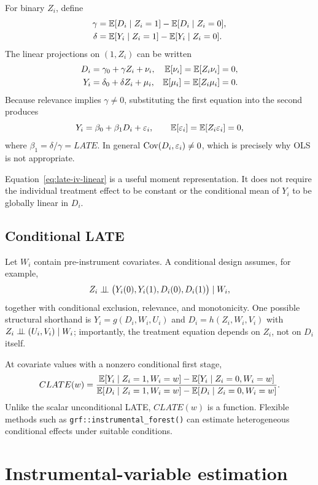 For binary $Z_i$, define
\begin{align*}
  \gamma&=\mathbb{E}[D_i\mid Z_i=1]-\mathbb{E}[D_i\mid Z_i=0],\\
  \delta&=\mathbb{E}[Y_i\mid Z_i=1]-\mathbb{E}[Y_i\mid Z_i=0].
\end{align*}
The linear projections on $(1,Z_i)$ can be written
\begin{align*}
  D_i&=\gamma_0+\gamma Z_i+\nu_i,
       &\mathbb{E}[\nu_i]=\mathbb{E}[Z_i\nu_i]=0,\\
  Y_i&=\delta_0+\delta Z_i+\mu_i,
       &\mathbb{E}[\mu_i]=\mathbb{E}[Z_i\mu_i]=0.
\end{align*}
Because relevance implies $\gamma\neq0$, substituting the first equation into
the second produces
\begin{equation}
  Y_i=\beta_0+\beta_1D_i+\varepsilon_i,
  \qquad
  \mathbb{E}[\varepsilon_i]=\mathbb{E}[Z_i\varepsilon_i]=0,
  \label{eq:late-iv-linear}
\end{equation}
where $\beta_1=\delta/\gamma=LATE$.  In general
$\operatorname{Cov}(D_i,\varepsilon_i)\neq0$, which is precisely why OLS is not appropriate.

Equation~\eqref{eq:late-iv-linear} is a useful moment representation.  It does
not require the individual treatment effect to be constant or the conditional
mean of $Y_i$ to be globally linear in $D_i$.

\subsection{Conditional LATE}

Let $W_i$ contain pre-instrument covariates.  A conditional design assumes, for
example,
\[
  Z_i\mathrel{\perp\!\!\!\perp}\bigl(Y_i(0),Y_i(1),D_i(0),D_i(1)\bigr)\mid W_i,
\]
together with conditional exclusion, relevance, and monotonicity.  One possible
structural shorthand is $Y_i=g(D_i,W_i,U_i)$ and
$D_i=h(Z_i,W_i,V_i)$ with $Z_i\mathrel{\perp\!\!\!\perp}(U_i,V_i)\mid W_i$; importantly, the
treatment equation depends on $Z_i$, not on $D_i$ itself.

At covariate values with a nonzero conditional first stage,
\begin{equation}
  CLATE(w)=
  \frac{\mathbb{E}[Y_i\mid Z_i=1,W_i=w]-\mathbb{E}[Y_i\mid Z_i=0,W_i=w]}
       {\mathbb{E}[D_i\mid Z_i=1,W_i=w]-\mathbb{E}[D_i\mid Z_i=0,W_i=w]}.
  \label{eq:clate}
\end{equation}
Unlike the scalar unconditional LATE, $CLATE(w)$ is a function.  Flexible
methods such as \texttt{grf::instrumental\_forest()} can estimate heterogeneous
conditional effects under suitable conditions.

\section{Instrumental-variable estimation}
\label{sec:late-estimation}

